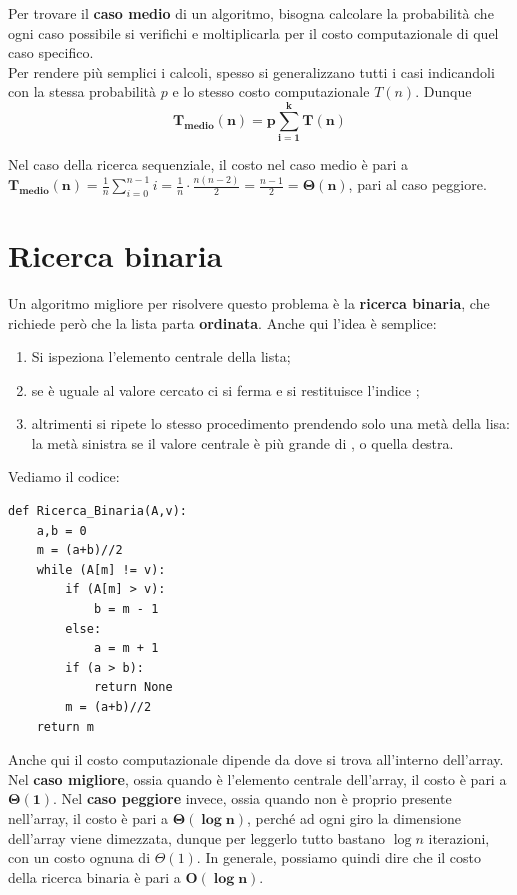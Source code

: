 \documentclass[11pt, a4paper, titlepage, oneside]{scrbook}
\begin{document}
\begin{Definizione}
\label{def-caso-medio}
Per trovare il \textbf{caso medio} di un algoritmo, bisogna calcolare la probabilità che ogni caso possibile si verifichi e moltiplicarla per il costo computazionale di quel caso specifico. \\
Per rendere più semplici i calcoli, spesso si generalizzano tutti i casi indicandoli con la stessa probabilità $p$ e lo stesso costo computazionale $T(n)$. Dunque 
\[
\bm{T_{\textbf{medio}}(n) = p \sum_{i = 1}^k T(n)}
\]
\end{Definizione}

Nel caso della ricerca sequenziale, il costo nel caso medio è pari a \mbox{$\bm{T_{\textbf{medio}}(n)} = \frac{1}{n} \sum_{i = 0}^{n-1} i = \frac{1}{n} \cdot \frac{n(n-2)}{2} = \frac{n-1}{2} = \bm{\Theta(n)}$}, pari al caso peggiore.

\section{Ricerca binaria}

\begin{Definizione}
\label{def-ricerca-binaria}
Un algoritmo migliore per risolvere questo problema è la \textbf{ricerca binaria}, che richiede però che la lista parta \textbf{ordinata}. Anche qui l'idea è semplice:
\begin{enumerate}[label=\arabic*°]
    \item Si ispeziona l'elemento centrale della lista;
    \item se è uguale al valore cercato ci si ferma e si restituisce l'indice ;
    \item altrimenti si ripete lo stesso procedimento prendendo solo una metà della lisa: la metà sinistra se il valore centrale è più grande di , o quella destra.
\end{enumerate}
\end{Definizione}

Vediamo il codice:
\begin{lstlisting}[style=Python]
def Ricerca_Binaria(A,v):
    a,b = 0
    m = (a+b)//2
    while (A[m] != v):
        if (A[m] > v):
            b = m - 1
        else:
            a = m + 1
        if (a > b):
            return None
        m = (a+b)//2
    return m
\end{lstlisting}

Anche qui il costo computazionale dipende da dove si trova  all'interno dell'array. Nel \textbf{caso migliore}, ossia quando  è l'elemento centrale dell'array, il costo è pari a $\bm{\Theta(1)}$. Nel \textbf{caso peggiore} invece, ossia quando  non è proprio presente nell'array, il costo è pari a $\bm{\Theta(\log n)}$, perché ad ogni giro la dimensione dell'array viene dimezzata, dunque per leggerlo tutto bastano $\log n$ iterazioni, con un costo ognuna di $\Theta(1)$. In generale, possiamo quindi dire che il costo della ricerca binaria è pari a $\bm{\textbf{O}(\log n)}$. 
\end{document}
